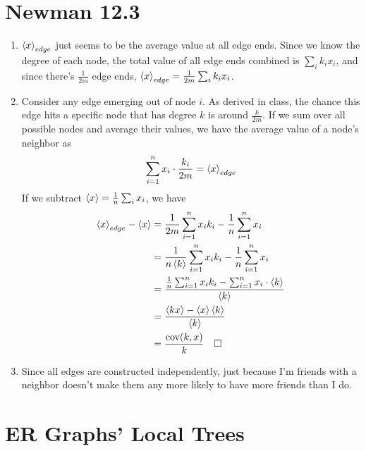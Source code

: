 \documentclass[12pt]{article}
\begin{document}
\section{Newman 12.3}

\begin{enumerate}
      \item $\braket{x}_{edge}$ just seems to be the average value at all edge ends.
            Since we know the degree of each node, the total value of all edge
            ends combined is $\sum_{i} k_i x_i$, and since there's $\frac{1}{2m}$ edge ends,
            $\braket{x}_{edge}=\frac{1}{2m} \sum_{i} k_i x_i$.

      \item Consider any edge emerging out of node $i$.
            As derived in class, the chance this edge hits a specific node that has degree $k$ is around $\frac{k}{2m}$.
            If we sum over all possible nodes and average their values, we have
            the average value of a node's neighbor as
            \[\sum_{i=1}^{n} x_i \cdot \frac{k_i}{2m} = \braket{x}_{edge}\]
            If we subtract $\braket{x}=\frac{1}{n} \sum_{i} x_i$, we have
            \begin{align*}
                  \braket{x}_{edge} - \braket{x}
                   & = \frac{1}{2m} \sum_{i=1}^{n} x_i k_i - \frac{1}{n} \sum_{i=1}^{n} x_i                       \\
                   & = \frac{1}{n\braket{k}} \sum_{i=1}^{n} x_i k_i - \frac{1}{n} \sum_{i=1}^{n} x_i              \\
                   & = \frac{\frac{1}{n}\sum_{i=1}^{n} x_i k_i - \sum_{i=1}^{n} x_i \cdot \braket{k}}{\braket{k}} \\
                   & = \frac{\braket{kx} - \braket{x}\braket{k}}{\braket{k}}                                      \\
                   & = \frac{\text{cov}(k, x)}{k}\quad\square
            \end{align*}

      \item Since all edges are constructed independently, just because
            I'm friends with a neighbor doesn't make them any more likely to
            have more friends than I do.
\end{enumerate}

\pagebreak

\section{ER Graphs' Local Trees}
\end{document}
